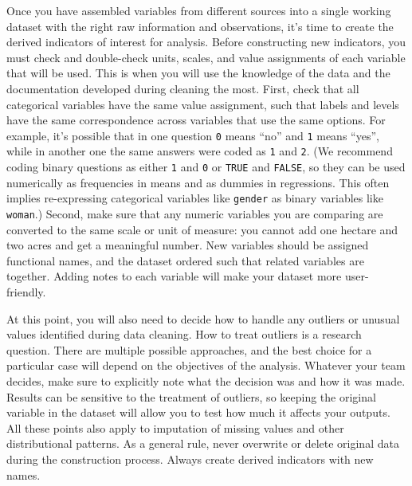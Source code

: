 Once you have assembled variables from different sources into a single working dataset
with the right raw information and observations,
it's time to create the derived indicators of interest for analysis.
Before constructing new indicators,
you must check and double-check units, scales, and value assignments of each variable that will be used.
This is when you will use the knowledge
of the data and the documentation developed during cleaning the most.
First, check that all categorical variables have the same value assignment,
such that labels and levels have the same correspondence across variables that use the same options.
For example, it's possible that in one question \texttt{0} means ``no'' and \texttt{1} means ``yes'',
while in another one the same answers were coded as \texttt{1} and \texttt{2}.
(We recommend coding binary questions as either \texttt{1} and \texttt{0} or \texttt{TRUE} and \texttt{FALSE},
so they can be used numerically as frequencies in means and as dummies in regressions.
This often implies re-expressing categorical variables like \texttt{gender} as binary variables like \texttt{woman}.)
Second, make sure that any numeric variables you are comparing
are converted to the same scale or unit of measure:
you cannot add one hectare and two acres and get a meaningful number.
New variables should be assigned functional names,
and the dataset ordered such that related variables are together.
Adding notes to each variable will make your dataset more user-friendly.

At this point, you will also need to decide
how to handle any outliers or unusual values identified during data cleaning.
How to treat outliers is a research question.
There are multiple possible approaches,
and the best choice for a particular case
will depend on the objectives of the analysis.
Whatever your team decides, make sure to explicitly note
what the decision was and how it was made.
Results can be sensitive to the treatment of outliers,
so keeping the original variable in the dataset
will allow you to test how much it affects your outputs.
All these points also apply to imputation of missing values and other distributional patterns.
As a general rule, never overwrite or delete original data during the construction process.
Always create derived indicators with new names.


